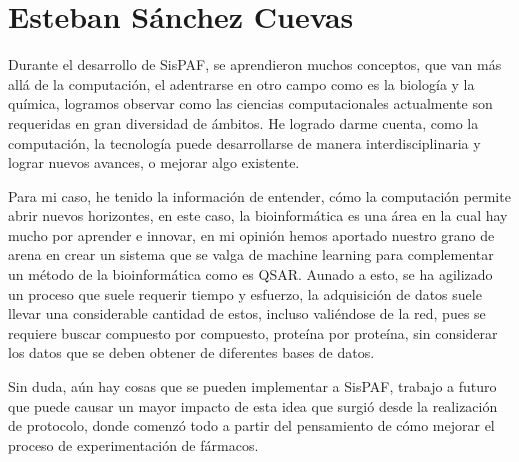 \section{Esteban Sánchez Cuevas}{
\noindent Durante el desarrollo de SisPAF, se aprendieron muchos conceptos, que van más allá de la computación, el adentrarse en otro campo como es la biología y la química, logramos observar  como las ciencias computacionales actualmente son requeridas en gran diversidad de ámbitos. He logrado darme cuenta, como la computación, la tecnología puede desarrollarse de manera interdisciplinaria y lograr nuevos avances, o mejorar algo   existente. 

\noindent Para mi caso, he tenido la información de entender, cómo la computación permite abrir nuevos horizontes, en este caso, la bioinformática es una área en la cual hay mucho por aprender e innovar, en mi opinión hemos aportado nuestro grano de arena en crear un sistema que se valga de machine learning para complementar un método de la bioinformática como es QSAR. Aunado a esto, se ha agilizado un proceso que suele requerir tiempo y esfuerzo, la adquisición de datos suele llevar una considerable cantidad de estos, incluso valiéndose de la red, pues se requiere buscar compuesto por compuesto, proteína por proteína, sin considerar los datos que se deben obtener de diferentes bases de datos.

\noindent Sin duda, aún hay cosas que se pueden implementar a SisPAF, trabajo a futuro que puede causar un mayor impacto de esta idea que surgió desde la realización de protocolo, donde comenzó todo a partir del pensamiento de cómo mejorar el proceso de experimentación de fármacos. 
 }
